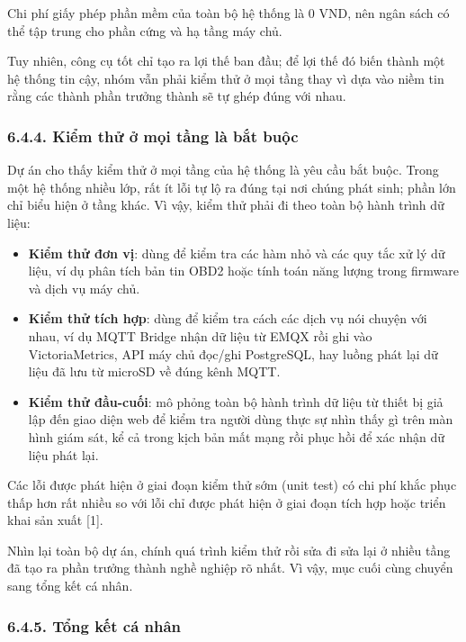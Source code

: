 \documentclass[a4paper]{extarticle}
\providecommand{\tightlist}{%
  \setlength{\itemsep}{0pt}\setlength{\parskip}{0pt}}
\begin{document}
Chi phí giấy phép phần mềm của toàn bộ hệ thống là 0 VND, nên ngân sách
có thể tập trung cho phần cứng và hạ tầng máy chủ.

Tuy nhiên, công cụ tốt chỉ tạo ra lợi thế ban đầu; để lợi thế đó biến
thành một hệ thống tin cậy, nhóm vẫn phải kiểm thử ở mọi tầng thay vì
dựa vào niềm tin rằng các thành phần trưởng thành sẽ tự ghép đúng với
nhau.

\subsubsection{6.4.4. Kiểm thử ở mọi tầng là bắt
buộc}\label{644-kiux1ec3m-thux1eed-ux1edf-mux1ecdi-tux1ea7ng-luxe0-bux1eaft-buux1ed9c}

Dự án cho thấy kiểm thử ở mọi tầng của hệ thống là yêu cầu bắt buộc.
Trong một hệ thống nhiều lớp, rất ít lỗi tự lộ ra đúng tại nơi chúng
phát sinh; phần lớn chỉ biểu hiện ở tầng khác. Vì vậy, kiểm thử phải đi
theo toàn bộ hành trình dữ liệu:

\begin{itemize}
\tightlist
\item
  \textbf{Kiểm thử đơn vị}: dùng để kiểm tra các hàm nhỏ và
  các quy tắc xử lý dữ liệu, ví dụ phân tích bản tin OBD2 hoặc tính toán
  năng lượng trong firmware và dịch vụ máy chủ.
\item
  \textbf{Kiểm thử tích hợp}: dùng để kiểm tra cách
  các dịch vụ nói chuyện với nhau, ví dụ MQTT Bridge nhận dữ liệu từ
  EMQX rồi ghi vào VictoriaMetrics, API máy chủ đọc/ghi PostgreSQL, hay
  luồng phát lại dữ liệu đã lưu từ microSD về đúng kênh MQTT.
\item
  \textbf{Kiểm thử đầu-cuối}: mô phỏng toàn bộ hành trình
  dữ liệu từ thiết bị giả lập đến giao diện web để kiểm tra người dùng
  thực sự nhìn thấy gì trên màn hình giám sát, kể cả trong kịch bản mất mạng rồi
  phục hồi để xác nhận dữ liệu phát lại.
\end{itemize}

Các lỗi được phát hiện ở giai đoạn kiểm thử sớm (unit test) có chi phí
khắc phục thấp hơn rất nhiều so với lỗi chỉ được phát hiện ở giai đoạn
tích hợp hoặc triển khai sản xuất {[}1{]}.

Nhìn lại toàn bộ dự án, chính quá trình kiểm thử rồi sửa đi sửa lại ở
nhiều tầng đã tạo ra phần trưởng thành nghề nghiệp rõ nhất. Vì vậy, mục
cuối cùng chuyển sang tổng kết cá nhân.

\subsubsection{6.4.5. Tổng kết cá
nhân}\label{645-tux1ed5ng-kux1ebft-cuxe1-nhuxe2n}
\end{document}
